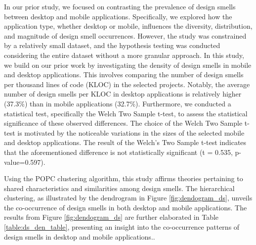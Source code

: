\documentclass[AMA,Times1COL]{WileyNJDv5} %
\begin{document}
	In our prior study\cite{ogenrwot}, we focused on contrasting the prevalence of design smells between desktop and mobile applications. Specifically, we explored how the application type, whether desktop or mobile, influences the diversity, distribution, and magnitude of design smell occurrences. However, the study was constrained by a relatively small dataset, and the hypothesis testing was conducted considering the entire dataset without a more granular approach. In this study, we build on our prior work by investigating the density of design smells in mobile and desktop applications. This involves comparing the number of design smells per thousand lines of code (KLOC) in the selected projects. Notably, the average number of design smells per KLOC in desktop applications is relatively higher (37.3\%) than in mobile applications (32.7\%). Furthermore, we conducted a statistical test, specifically the Welch Two Sample t-test, to assess the statistical significance of these observed differences. The choice of the Welch Two Sample t-test is motivated by the noticeable variations in the sizes of the selected mobile and desktop applications. The result of the Welch's Two Sample t-test indicates that the aforementioned difference is not statistically significant (t = 0.535, p-value=0.597).

	Using the POPC clustering algorithm, this study affirms theories pertaining to shared characteristics and similarities among design smells. The hierarchical clustering, as illustrated by the dendrogram in Figure \ref{fig:dendogram_ds}, unveils the co-occurrence of design smells in both desktop and mobile applications. The results from Figure \ref{fig:dendogram_ds} are further elaborated in Table \ref{table:ds_den_table}, presenting an insight into the co-occurrence patterns of design smells in desktop and mobile applications..
	
\end{document}
